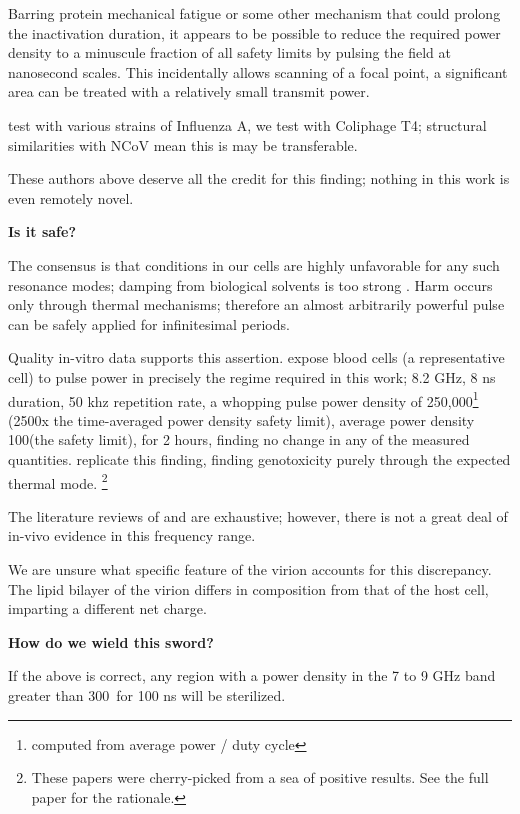\documentclass[fleqn,10pt]{paper}
\begin{document}
Barring protein mechanical fatigue \cite{Mechanical2013} or some other mechanism that could prolong the inactivation duration, it appears to be possible to reduce the required power density to a minuscule fraction of all safety limits by pulsing the field at nanosecond scales. This incidentally allows scanning of a focal point, a significant area can be treated with a relatively small transmit power.

\cite{Efficient2015} test with various strains of Influenza A, we test with Coliphage T4; structural similarities with NCoV mean this is may be transferable.

These authors above deserve all the credit for this finding; nothing in this work is even remotely novel.

{\Large \textbf{Is it safe?}}

The consensus is that conditions in our cells are highly unfavorable for any such resonance modes; damping from biological solvents is too strong \cite{Vibrational2002}. Harm occurs only through thermal mechanisms; therefore an almost arbitrarily powerful pulse can be safely applied for infinitesimal periods.

Quality in-vitro data supports this assertion. \cite{Cytogenetic2006} expose blood cells (a representative cell) to pulse power in precisely the regime required in this work; 8.2 GHz, 8 ns duration, 50 khz repetition rate, a whopping pulse power density of 250,000\Wsqm\footnote{computed from average power / duty cycle} (2500x the time-averaged power density safety limit), average power density 100\Wsqm (the safety limit), for 2 hours, finding no change in any of the measured quantities. \cite{DNA2004} replicate this finding, finding genotoxicity purely through the expected thermal mode. \footnote{These papers were cherry-picked from a sea of positive results. See the full paper for the rationale.}

The literature reviews of \cite{ICNIRP2020} and \cite{C95} are exhaustive; however, there is not a great deal of in-vivo evidence in this frequency range\cite{New2019}\cite{Comprehensive2018}.

We are unsure what specific feature of the virion accounts for this discrepancy. The lipid bilayer of the virion differs in composition from that of the host cell, imparting a different net charge.

\clearpage 
{\Large \textbf{How do we wield this sword?}}

If the above is correct, any region with a power density in the 7 to 9 GHz band greater than 300\Wsqm \ for 100 ns will be sterilized.
\end{document}
